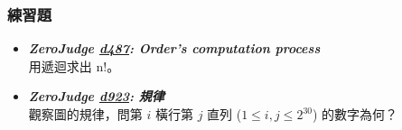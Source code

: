 \subsubsection*{練習題}
\begin{itemize}[label={\Checkmark}]
\item \textbf{\textit{ZeroJudge \href{http://zerojudge.tw/ShowProblem?problemid=d487}{d487}: Order's computation process}}\\
用遞迴求出 n!。
\item \textbf{\textit{ZeroJudge \href{http://zerojudge.tw/ShowProblem?problemid=d923}{d923}: 規律}}\\
觀察圖的規律，問第 $i$ 橫行第 $j$ 直列 ($1\leq{i,j}\leq{2^{30}}$) 的數字為何？
\end{itemize}